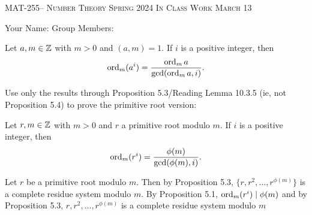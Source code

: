 \documentclass[handout]{ximera}
\date{March 13, 2024}
\begin{document}
\handoutAbstract
\maketitle
    \begin{center}%
        {\large \scshape MAT-255-- Number Theory \hfill Spring 2024 \hfill In Class Work March 13}%
        
        {\large
            Your Name: \hrulefill \quad Group Members:\hrulefill \quad \hrulefill
        \par}%
    \end{center}%
 

\begin{prop*}[Proposition 5.4]\label{prop:compare-order}
    Let $a,m\in\mathbb Z$ with $m>0$ and $(a,m)=1.$ If $i$ is a positive integer, then 
    \[\operatorname{ord}_m(a^i)=\frac{\operatorname{ord}_m a}{\gcd(\operatorname{ord}_m a,i)}.\]
\end{prop*}

\begin{br}
    Use only the results through Proposition 5.3/Reading Lemma 10.3.5 (ie, not Proposition 5.4) to prove the primitive root version:


    \begin{prop*}
        Let $r,m\in\mathbb Z$ with $m>0$ and $r$ a primitive root modulo $m.$
        If $i$ is a positive integer, then 
    \[\operatorname{ord}_m(r^i)=\frac{\phi(m)}{\gcd(\phi(m),i)}.\]
    \end{prop*}
    \begin{solution}
        Let $r$ be a primitive root modulo $m.$ Then by Proposition 5.3, $\{r,r^2,\dots,r^{\phi(m)}\}$ is a complete residue system modulo $m.$
        By Proposition 5.1, $\operatorname{ord}_m(r^i)\mid \phi(m)$ and by Proposition 5.3, $r,r^2,\dots,r^{\phi(m)}$ is a complete residue system modulo $m$ 
    \end{solution}
    \pdfOnly{\ifhandout
        \vfill
        \else\fi}
\end{br}
\end{document}
